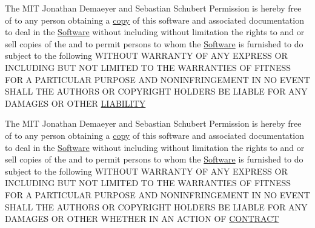 \begin{DoxyCompactItemize}
\item 
The M\+IT Jonathan Demaeyer and Sebastian Schubert Permission is hereby free of to any person obtaining a \hyperlink{LICENSE_8txt_a51c339ce34cc545067d7d7c01c627159}{copy} of this software and associated documentation to deal in the \hyperlink{LICENSE_8txt_a5972617605af8d0ee35a18608e832e08}{Software} without including without limitation the rights to and or sell copies of the and to permit persons to whom the \hyperlink{LICENSE_8txt_a5972617605af8d0ee35a18608e832e08}{Software} is furnished to do subject to the following W\+I\+T\+H\+O\+UT W\+A\+R\+R\+A\+N\+TY OF A\+NY E\+X\+P\+R\+E\+SS OR I\+N\+C\+L\+U\+D\+I\+NG B\+UT N\+OT L\+I\+M\+I\+T\+ED TO T\+HE W\+A\+R\+R\+A\+N\+T\+I\+ES OF F\+I\+T\+N\+E\+SS F\+OR A P\+A\+R\+T\+I\+C\+U\+L\+AR P\+U\+R\+P\+O\+SE A\+ND N\+O\+N\+I\+N\+F\+R\+I\+N\+G\+E\+M\+E\+NT IN NO E\+V\+E\+NT S\+H\+A\+LL T\+HE A\+U\+T\+H\+O\+RS OR C\+O\+P\+Y\+R\+I\+G\+HT H\+O\+L\+D\+E\+RS BE L\+I\+A\+B\+LE F\+OR A\+NY D\+A\+M\+A\+G\+ES OR O\+T\+H\+ER \hyperlink{LICENSE_8txt_ad31e61c61cdb35ab358c01b9b3ef9ce1}{L\+I\+A\+B\+I\+L\+I\+TY}
\item 
The M\+IT Jonathan Demaeyer and Sebastian Schubert Permission is hereby free of to any person obtaining a \hyperlink{LICENSE_8txt_a51c339ce34cc545067d7d7c01c627159}{copy} of this software and associated documentation to deal in the \hyperlink{LICENSE_8txt_a5972617605af8d0ee35a18608e832e08}{Software} without including without limitation the rights to and or sell copies of the and to permit persons to whom the \hyperlink{LICENSE_8txt_a5972617605af8d0ee35a18608e832e08}{Software} is furnished to do subject to the following W\+I\+T\+H\+O\+UT W\+A\+R\+R\+A\+N\+TY OF A\+NY E\+X\+P\+R\+E\+SS OR I\+N\+C\+L\+U\+D\+I\+NG B\+UT N\+OT L\+I\+M\+I\+T\+ED TO T\+HE W\+A\+R\+R\+A\+N\+T\+I\+ES OF F\+I\+T\+N\+E\+SS F\+OR A P\+A\+R\+T\+I\+C\+U\+L\+AR P\+U\+R\+P\+O\+SE A\+ND N\+O\+N\+I\+N\+F\+R\+I\+N\+G\+E\+M\+E\+NT IN NO E\+V\+E\+NT S\+H\+A\+LL T\+HE A\+U\+T\+H\+O\+RS OR C\+O\+P\+Y\+R\+I\+G\+HT H\+O\+L\+D\+E\+RS BE L\+I\+A\+B\+LE F\+OR A\+NY D\+A\+M\+A\+G\+ES OR O\+T\+H\+ER W\+H\+E\+T\+H\+ER IN AN A\+C\+T\+I\+ON OF \hyperlink{LICENSE_8txt_a5b4156ad0b4190af85988fa2674b4928}{C\+O\+N\+T\+R\+A\+CT}
\item 

\end{DoxyCompactItemize}
